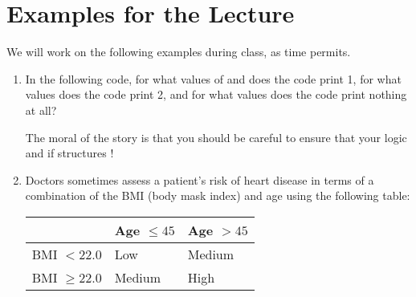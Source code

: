 \documentclass[letterpaper,10pt,english]{sphinxmanual}
\begin{document}
\section{Examples for the Lecture}
\label{\detokenize{lecture_notes/lec11_conditionals2:examples-for-the-lecture}}
We will work on the following examples during class, as time permits.
\begin{enumerate}
\def\theenumi{\arabic{enumi}}
\def\labelenumi{\theenumi .}
\makeatletter\def\p@enumii{\p@enumi \theenumi .}\makeatother
\item {} 
In the following code, for what values of  and  does the
code print 1, for what values does the code print 2, and for what
values does the code print nothing at all?

\begin{sphinxVerbatim}[commandchars=\\\{\}]
       
           
               
\end{sphinxVerbatim}

The moral of the story is that you should be careful to ensure that
your logic and if structures !

\item {} 
Doctors sometimes assess a patient’s risk of heart disease in terms of a
combination of the BMI (body mask index) and age using the following
table:


\begin{savenotes}\sphinxattablestart
\centering
\begin{tabulary}{\linewidth}[t]{|T|T|T|}
\hline
\sphinxstyletheadfamily &\sphinxstyletheadfamily 
Age \(\leq 45\)
&\sphinxstyletheadfamily 
Age \(> 45\)
\\
\hline
BMI \(< 22.0\)
&
Low
&
Medium
\\
\hline
BMI \(\geq 22.0\)
&
Medium
&
High
\\
\hline
\end{tabulary}
\par
\sphinxattableend\end{savenotes}


\end{enumerate}
\end{document}
